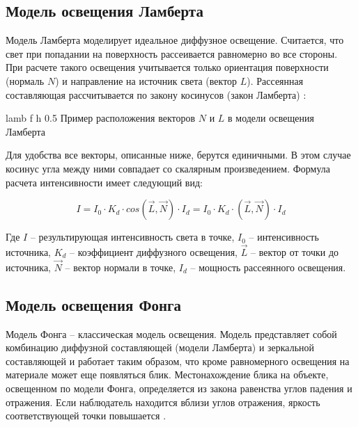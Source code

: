 \subsection{Модель освещения Ламберта}

Модель Ламберта моделирует идеальное диффузное освещение. Считается,
что свет при попадании на поверхность рассеивается равномерно во все стороны.
При расчете такого освещения учитывается только ориентация поверхности  (нормаль $N$) и направление на источник света (вектор $L$). Рассеянная составляющая рассчитывается по
закону косинусов (закон Ламберта) \cite{modli}: 

\clearpage

{lamb} %
{f} %
{h} %
{0.5\textwidth} %
{Пример расположения векторов $N$ и $L$ в модели освещения Ламберта} %

Для удобства все векторы, описанные ниже, берутся единичными. В этом случае косинус угла между ними совпадает со скалярным произведением. Формула расчета интенсивности имеет следующий вид:


\begin{equation}
	\label{equ:lambert}
	I = I_0 \cdot K_d \cdot cos(\vec{L}, \vec{N}) \cdot I_d = I_0 \cdot K_d \cdot (\vec{L}, \vec{N}) \cdot I_d
\end{equation}

Где $I$ -- результирующая интенсивность света в точке, $I_0$ -- интенсивность источника, $K_d$ -- коэффициент диффузного освещения, $\vec{L}$ -- вектор от точки до
источника, $\vec{N}$ -- вектор нормали в точке, $I_d$ -- мощность рассеянного освещения.

\subsection{Модель освещения Фонга}

Модель Фонга – классическая модель освещения. Модель представляет собой комбинацию диффузной составляющей (модели Ламберта) и зеркальной составляющей и работает таким образом, что кроме равномерного освещения на  материале может еще появляться блик. Местонахождение блика на объекте, освещенном по модели Фонга, определяется из закона равенства углов падения и отражения. Если наблюдатель находится вблизи углов отражения, яркость соответствующей точки повышается \cite{modli}.

